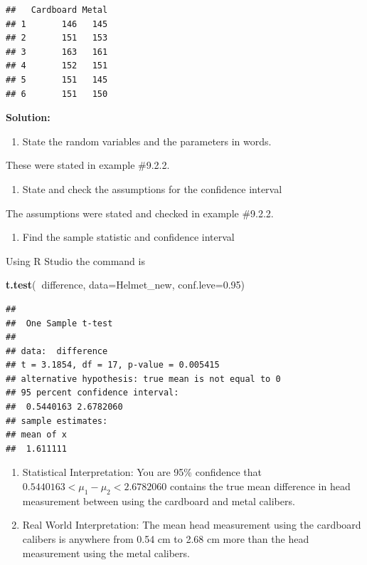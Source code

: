 \documentclass[]{book}
\newenvironment{Shaded}{\begin{snugshade}}{\end{snugshade}}
\newcommand{\DataTypeTok}[1]{\textcolor[rgb]{0.13,0.29,0.53}{#1}}
\newcommand{\FloatTok}[1]{\textcolor[rgb]{0.00,0.00,0.81}{#1}}
\newcommand{\KeywordTok}[1]{\textcolor[rgb]{0.13,0.29,0.53}{\textbf{#1}}}
\newcommand{\NormalTok}[1]{#1}
\newcommand{\OperatorTok}[1]{\textcolor[rgb]{0.81,0.36,0.00}{\textbf{#1}}}
\providecommand{\tightlist}{%
  \setlength{\itemsep}{0pt}\setlength{\parskip}{0pt}}
\begin{document}
\begin{verbatim}
##   Cardboard Metal
## 1       146   145
## 2       151   153
## 3       163   161
## 4       152   151
## 5       151   145
## 6       151   150
\end{verbatim}

\textbf{Solution:}

\begin{enumerate}
\def\labelenumi{\arabic{enumi}.}
\tightlist
\item
  State the random variables and the parameters in words.
\end{enumerate}

These were stated in example \#9.2.2.

\begin{enumerate}
\def\labelenumi{\arabic{enumi}.}
\setcounter{enumi}{1}
\tightlist
\item
  State and check the assumptions for the confidence interval
\end{enumerate}

The assumptions were stated and checked in example \#9.2.2.

\begin{enumerate}
\def\labelenumi{\arabic{enumi}.}
\setcounter{enumi}{2}
\tightlist
\item
  Find the sample statistic and confidence interval
\end{enumerate}

Using R Studio the command is

\begin{Shaded}
\begin{Highlighting}[]
\KeywordTok{t.test}\NormalTok{(}\OperatorTok{~}\NormalTok{difference, }\DataTypeTok{data=}\NormalTok{Helmet_new, }\DataTypeTok{conf.leve=}\FloatTok{0.95}\NormalTok{)}
\end{Highlighting}
\end{Shaded}

\begin{verbatim}
## 
##  One Sample t-test
## 
## data:  difference
## t = 3.1854, df = 17, p-value = 0.005415
## alternative hypothesis: true mean is not equal to 0
## 95 percent confidence interval:
##  0.5440163 2.6782060
## sample estimates:
## mean of x 
##  1.611111
\end{verbatim}

\begin{enumerate}
\def\labelenumi{\arabic{enumi}.}
\setcounter{enumi}{3}
\item
  Statistical Interpretation: You are 95\% confidence that \(0.5440163<\mu_1-\mu_2<2.6782060\) contains the true mean difference in head measurement between using the cardboard and metal calibers.
\item
  Real World Interpretation: The mean head measurement using the cardboard calibers is anywhere from 0.54 cm to 2.68 cm more than the head measurement using the metal calibers.
\end{enumerate}
\end{document}
